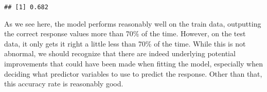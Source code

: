 \documentclass[
]{article}
\begin{document}
\begin{verbatim}
## [1] 0.682
\end{verbatim}

As we see here, the model performs reasonably well on the train data,
outputting the correct response values more than 70\% of the time.
However, on the test data, it only gets it right a little less than 70\%
of the time. While this is not abnormal, we should recognize that there
are indeed underlying potential improvements that could have been made
when fitting the model, especially when deciding what predictor
variables to use to predict the response. Other than that, this accuracy
rate is reasonably good.
\end{document}
